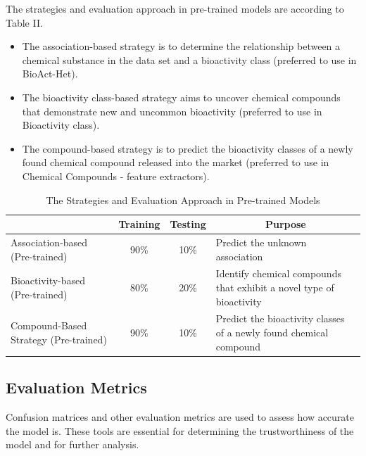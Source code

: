 \documentclass[conference]{IEEEtran}
\begin{document}
The strategies and evaluation approach in pre-trained models are according to Table II.\\

\begin{itemize}
  \item The association-based strategy is to determine the relationship between a chemical substance in the data set and a bioactivity class (preferred to use in BioAct-Het).
  \item The bioactivity class-based strategy aims to uncover chemical compounds that demonstrate new and uncommon bioactivity (preferred to use in Bioactivity class).
  \item The compound-based strategy is to predict the bioactivity classes of a newly found chemical compound released into the market (preferred to use in Chemical Compounds - feature extractors).
\end{itemize}

\begin{table}[h!]
  \caption{The Strategies and Evaluation Approach in Pre-trained Models}
  \label{tab:your_label_here}
  \centering
  \begin{tabular}{|m{2.2cm}|c|c|m{2.8cm}|}
    \hline
    \rowcolor{headercolor}
    \multicolumn{1}{|c|}{\textbf{Category}}        & \multicolumn{1}{c|}{\textbf{Training}} & \multicolumn{1}{c|}{\textbf{Testing}} & \multicolumn{1}{c|}{\textbf{Purpose}}                                \\ \hline
    Association-based \newline (Pre-trained)       & 90\%                                   & 10\%                                  & Predict the unknown \newline association                             \\ \hline
    Bioactivity-based \newline (Pre-trained)       & 80\%                                   & 20\%                                  & Identify chemical compounds that exhibit a novel type of bioactivity \\ \hline
    Compound-Based Strategy \newline (Pre-trained) & 90\%                                   & 10\%                                  & Predict the bioactivity classes of a newly found chemical compound   \\ \hline
  \end{tabular}
\end{table}

\subsection{Evaluation Metrics}
Confusion matrices and other evaluation metrics are used to assess how accurate the model is. These tools are essential for determining the trustworthiness of the model and for further analysis.
\end{document}
